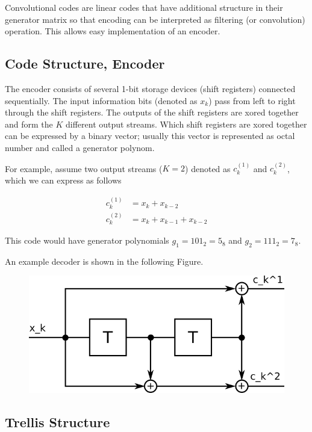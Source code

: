 
Convolutional codes are linear codes that have additional structure in their generator matrix so that encoding can be interpreted as filtering (or convolution) operation. This allows easy implementation of an encoder.

\subsection{Code Structure, Encoder}

The encoder consists of several 1-bit storage devices (shift registers) connected sequentially. The input information bits (denoted as $x_k$) pass from left to right through the shift registers. The outputs of the shift registers are xored together and form the $K$ different output streams. Which shift registers are xored together can be expressed by a binary vector; usually this vector is represented as octal number and called a generator polynom.

For example, assume two output streams ($K = 2$) denoted as $c_{k}^{(1)}$ and $c_{k}^{(2)}$, which we can express as follows

\begin{align*}
c_{k}^{(1)} &= x_k + x_{k-2} \\
c_{k}^{(2)} &= x_k + x_{k-1} + x_{k-2}
\end{align*}

This code would have generator polynomials $g_1 = 101_2 = 5_8$ and $g_2 = 111_2 = 7_8$.

An example decoder is shown in the following Figure.

\begin{figure}[h]
  \includegraphics[scale=1.5]{images/convcodes_1_1.png}
\end{figure}


\subsection{Trellis Structure}

